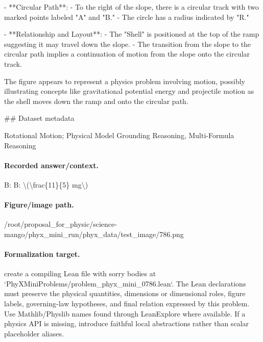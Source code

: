 - **Circular Path**:
  - To the right of the slope, there is a circular track with two marked points labeled "A" and "B."
  - The circle has a radius indicated by "R."

- **Relationship and Layout**:
  - The "Shell" is positioned at the top of the ramp suggesting it may travel down the slope.
  - The transition from the slope to the circular path implies a continuation of motion from the slope onto the circular track.

The figure appears to represent a physics problem involving motion, possibly illustrating concepts like gravitational potential energy and projectile motion as the shell moves down the ramp and onto the circular path.

\#\# Dataset metadata

Rotational Motion; Physical Model Grounding Reasoning, Multi-Formula Reasoning

\paragraph{Recorded answer/context.}
B: B: \textbackslash{}(\textbackslash{}frac\{11\}\{5\} mg\textbackslash{})

\paragraph{Figure/image path.}
/root/proposal\_for\_physic/science-mango/phyx\_mini\_run/phyx\_data/test\_image/786.png

\paragraph{Formalization target.}
create a compiling Lean file with sorry bodies at `PhyXMiniProblems/problem\_phyx\_mini\_0786.lean`. The Lean declarations must preserve the physical quantities, dimensions or dimensional roles, figure labels, governing-law hypotheses, and final relation expressed by this problem.
Use Mathlib/Physlib names found through LeanExplore where available. If a physics API is missing, introduce faithful local abstractions rather than scalar placeholder aliases.

